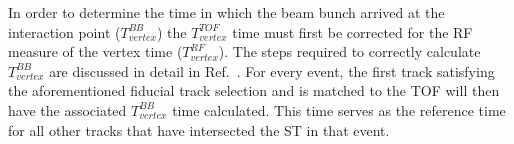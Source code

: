 In order to determine the time in which the beam bunch arrived at the interaction point ($T^{BB}_{vertex}$) the $T^{TOF}_{vertex}$ time must first be corrected for the RF measure of the vertex time ($T^{RF}_{vertex}$).  The steps required to correctly calculate $T^{BB}_{vertex}$ are discussed in detail in Ref.~\cite{pooser16}.  For every event, the first track satisfying the aforementioned fiducial track selection and is matched to the TOF will then have the associated $T^{BB}_{vertex}$ time calculated.  This time serves as the reference time for all other tracks that have intersected the ST in that event.




